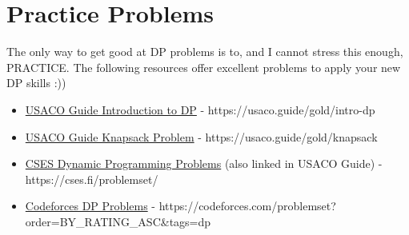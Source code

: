 \documentclass{article}
\begin{document}
\section{Practice Problems}
The only way to get good at DP problems is to, and I cannot stress this enough, PRACTICE. The following resources offer excellent problems to apply your new DP skills :))
\begin{itemize}
    \item \href{https://usaco.guide/gold/intro-dp}{USACO Guide Introduction to DP} - https://usaco.guide/gold/intro-dp
    \item \href{https://usaco.guide/gold/knapsack}{USACO Guide Knapsack Problem} - https://usaco.guide/gold/knapsack
    \item \href{https://cses.fi/problemset/}{CSES Dynamic Programming Problems} (also linked in USACO Guide) - https://cses.fi/problemset/
    \item \href{https://codeforces.com/problemset?order=BY_RATING_ASC&tags=dp}{Codeforces DP Problems} - https://codeforces.com/problemset?order=BY\_RATING\_ASC&tags=dp
\end{itemize}
\end{document}
